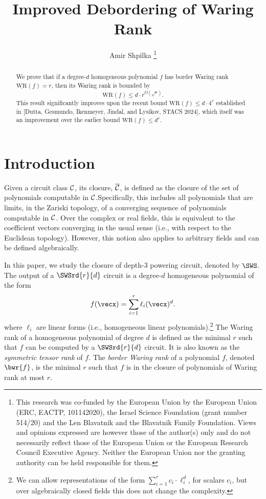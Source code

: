\documentclass{article}
\title{Improved Debordering of Waring Rank}
\author{Amir Shpilka
\thanks{This research was co-funded by the European Union by the European Union (ERC, EACTP, 101142020), the Israel Science Foundation (grant number 514/20) and  the Len Blavatnik and the Blavatnik Family Foundation. Views and opinions expressed are however those of the author(s) only and do not necessarily reflect those of the European Union or the European Research Council Executive Agency. Neither the European Union nor the granting authority can be held responsible for them.}
}
\date{}
\begin{document}
\maketitle
 

\begin{abstract}
    We prove that if a degree-$d$ homogeneous polynomial $f$ has border Waring rank $\underline{\mathrm{WR}}({f}) = r$, then its Waring rank is bounded by 
\[
{\mathrm{WR}}({f}) \leq d \cdot r^{O(\sqrt{r})}.
\]
This result significantly improves upon the recent bound ${\mathrm{WR}}({f}) \leq d \cdot 4^r$ established in [Dutta, Gesmundo, Ikenmeyer, Jindal, and Lysikov, STACS 2024], which itself was an improvement over the earlier bound ${\mathrm{WR}}({f}) \leq d^r$.
\end{abstract}



\section{Introduction}

Given a circuit class ${\cal C}$, its closure, $\overline{\cal C}$, is defined as the closure of the set of polynomials computable in ${\cal C}$.Specifically, this includes all polynomials that are limits, in the Zariski topology, of a converging sequence of polynomials computable in ${\cal C}$. Over the complex or real fields, this is equivalent to the coefficient vectors converging in the usual sense (i.e., with respect to the Euclidean topology). However, this notion also applies to arbitrary fields and can be defined algebraically. 



In this paper, we study the closure of depth-$3$ powering circuit, denoted by $\SWS$. The output of a $\SWSrd{r}{d}$ circuit is a degree-$d$ homogeneous polynomial of the form 
\[f(\vecx)=\sum_{i=1}^{r}\ell_i(\vecx)^d.
\] 
where $\ell_i$ are linear forms (i.e., homogeneous linear polynomials).\footnote{We can allow representations of the form $\sum_{i=1}^{r}c_i\cdot \ell_i^d$, for scalars $c_i$, but over algebraically closed fields this does not change the complexity.} The Waring rank of a homogeneous polynomial of degree $d$ is defined as the minimal $r$ such that $f$ can be computed by a $\SWSrd{r}{d}$ circuit. It is also known as the \emph{symmetric tensor rank} of $f$. The \emph{border Waring rank} of a polynomial $f$, denoted $\bwr{f}$, is the minimal $r$ such that $f$ is in the closure of polynomials of Waring rank at most $r$. 
\end{document}
